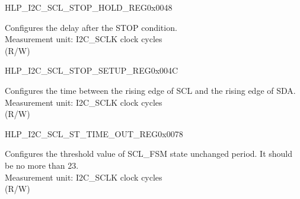     \begin{register}{H}{LP\_I2C\_SCL\_STOP\_HOLD\_REG}{0x0048}\label{regdesc:LPI2CSCLSTOPHOLDREG}
    \regnewline%
    \begin{regdesc}\begin{reglist}
    \label{fielddesc:LPI2CSCLSTOPHOLDTIME}\item [LP\_I2C\_SCL\_STOP\_HOLD\_TIME] Configures the delay after the STOP condition.\\
    Measurement unit: I2C\_SCLK clock cycles \\ (R/W)
    \end{reglist}\end{regdesc}
    \end{register}


    \begin{register}{H}{LP\_I2C\_SCL\_STOP\_SETUP\_REG}{0x004C}\label{regdesc:LPI2CSCLSTOPSETUPREG}
    \regnewline%
    \begin{regdesc}\begin{reglist}
    \label{fielddesc:LPI2CSCLSTOPSETUPTIME}\item [LP\_I2C\_SCL\_STOP\_SETUP\_TIME] Configures the time between the rising edge of SCL and the rising edge of SDA.\\
    Measurement unit: I2C\_SCLK clock cycles \\ (R/W)
    \end{reglist}\end{regdesc}
    \end{register}


    \begin{register}{H}{LP\_I2C\_SCL\_ST\_TIME\_OUT\_REG}{0x0078}\label{regdesc:LPI2CSCLSTTIMEOUTREG}
    \regnewline%
    \begin{regdesc}\begin{reglist}
    \label{fielddesc:LPI2CSCLSTTOI2C}\item [LP\_I2C\_SCL\_ST\_TO\_I2C] Configures the threshold value of SCL\_FSM state unchanged period. It should be no more than 23.\\
    Measurement unit: I2C\_SCLK clock cycles \\ (R/W)
    \end{reglist}\end{regdesc}
    \end{register}


